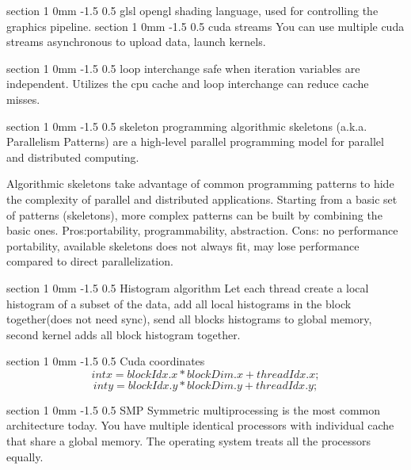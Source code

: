 \documentclass[a4paper,11pt]{article}
\makeatletter
\renewcommand{\section}{\@startsection
   {section}%
   {1}%
   {0mm}%
   {-1.5\baselineskip}%
   {0.5\baselineskip}%
   {\sffamily\bfseries\upshape\normalsize}}%
\makeatother
\begin{document}
\section{glsl}
opengl shading language, used for controlling the graphics pipeline.
\section{cuda streams}
You can use multiple cuda streams asynchronous to upload data, launch kernels.

\section{loop interchange}
safe when iteration variables are independent. Utilizes the cpu cache and loop interchange can reduce cache misses.

\section{skeleton programming}
algorithmic skeletons (a.k.a. Parallelism Patterns) are a high-level parallel programming model for parallel and distributed computing.

Algorithmic skeletons take advantage of common programming patterns to hide the complexity of parallel and distributed applications. Starting from a basic set of patterns (skeletons), more complex patterns can be built by combining the basic ones.
Pros:portability, programmability, abstraction. Cons: no performance portability,  available skeletons does not always fit, may lose performance compared to direct parallelization.

\section{Histogram algorithm}
Let each thread create a local histogram of a subset of the data, add all local histograms in the block together(does not need sync), send all blocks histograms to global memory, second kernel adds all block histogram together. 

\section{Cuda coordinates}
$$int x = blockIdx.x * blockDim.x + threadIdx.x;$$
 $$ int y = blockIdx.y * blockDim.y + threadIdx.y;$$

\section{SMP}
Symmetric multiprocessing is the most common architecture today. You have multiple identical processors with individual cache that share a global memory. The operating system treats all the processors equally.
\end{document}
